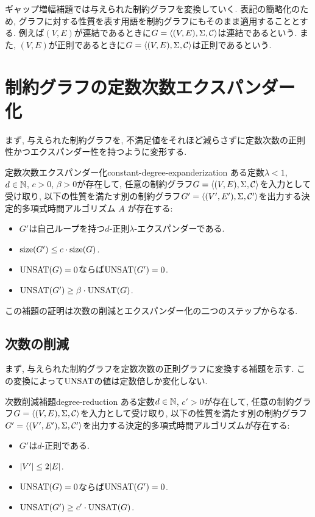 ギャップ増幅補題では与えられた制約グラフを変換していく.
表記の簡略化のため, グラフに対する性質を表す用語を制約グラフにもそのまま適用することとする.
例えば$(V,E)$が連結であるときに$G=\langle(V,E),\Sigma,\mathcal{C}\rangle$は連結であるという.
また, $(V,E)$が正則であるときに$G=\langle(V,E),\Sigma,\mathcal{C}\rangle$は正則であるという.


\section{制約グラフの定数次数エクスパンダー化}

まず, 与えられた制約グラフを, 不満足値をそれほど減らさずに定数次数の正則性かつエクスパンダー性を持つように変形する.

\begin{lemma}{定数次数エクスパンダー化}{constant-degree-expanderization}
  ある定数$\lambda<1$, $d\in\mathbb{N}$, $c>0$, $\beta>0$が存在して,
  任意の制約グラフ$G=\langle(V,E),\Sigma,\mathcal{C}\rangle$を入力として受け取り, 以下の性質を満たす別の制約グラフ$G'=\langle(V',E'),\Sigma,\mathcal{C}'\rangle$を出力する決定的多項式時間アルゴリズム $A$ が存在する:
  \begin{itemize}
    \item $G'$は自己ループを持つ$d$-正則$\lambda$-エクスパンダーである.
    \item $\mathrm{size}(G') \le c\cdot \mathrm{size}(G)$.
    \item $\mathrm{UNSAT}(G)=0$ならば$\mathrm{UNSAT}(G')=0$.
    \item $\mathrm{UNSAT}(G') \ge \beta\cdot\mathrm{UNSAT}(G)$.
  \end{itemize}
\end{lemma}

この補題の証明は次数の削減とエクスパンダー化の二つのステップからなる.

\subsection{次数の削減}

まず, 与えられた制約グラフを定数次数の正則グラフに変換する補題を示す.
この変換によって$\mathrm{UNSAT}$の値は定数倍しか変化しない.

\begin{lemma}{次数削減補題}{degree-reduction}
  ある定数$d\in\mathbb{N}$, $c'>0$が存在して, 任意の制約グラフ$G=\langle(V,E),\Sigma,\mathcal{C}\rangle$を入力として受け取り, 以下の性質を満たす別の制約グラフ$G'=\langle(V',E'),\Sigma,\mathcal{C}'\rangle$を出力する決定的多項式時間アルゴリズムが存在する:
  \begin{itemize}
    \item $G'$は$d$-正則である.
    \item $\abs{V'} \le 2\abs{E}$.
    \item $\mathrm{UNSAT}(G)=0$ならば$\mathrm{UNSAT}(G')=0$.
    \item $\mathrm{UNSAT}(G') \ge c'\cdot \mathrm{UNSAT}(G)$.
  \end{itemize}
\end{lemma}

